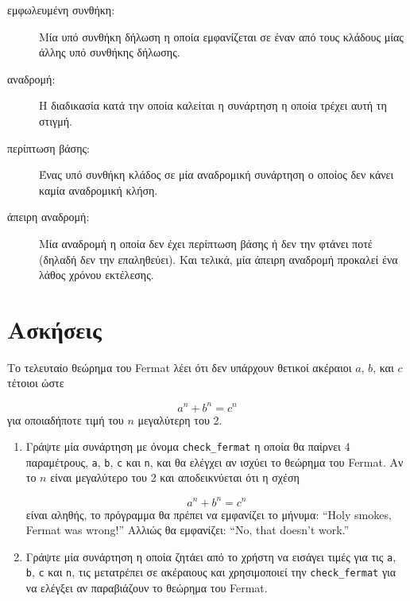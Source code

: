 \documentclass[10pt]{book}
\begin{document}
\begin{description}
\item[εμφωλευμένη συνθήκη:]  Μία υπό συνθήκη δήλωση η οποία εμφανίζεται σε
έναν από τους κλάδους μίας άλλης υπό συνθήκης δήλωσης.

\item[αναδρομή:]  Η διαδικασία κατά την οποία καλείται η συνάρτηση η οποία
τρέχει αυτή τη στιγμή.

\item[περίπτωση βάσης:]  Ένας υπό συνθήκη κλάδος σε μία αναδρομική συνάρτηση
ο οποίος δεν κάνει καμία αναδρομική κλήση.

\item[άπειρη αναδρομή:]  Μία αναδρομή η οποία δεν έχει περίπτωση βάσης ή δεν
την φτάνει ποτέ (δηλαδή δεν την επαληθεύει). Και τελικά, μία άπειρη αναδρομή προκαλεί
ένα λάθος χρόνου εκτέλεσης.

\end{description}

\section{Ασκήσεις}

\begin{exercise}

Το τελευταίο θεώρημα του Fermat λέει ότι δεν υπάρχουν θετικοί ακέραιοι $a$, $b$, και $c$ τέτοιοι ώστε

\[ a^n + b^n = c^n \]
%
για οποιαδήποτε τιμή του $n$ μεγαλύτερη του 2.

\begin{enumerate}

\item Γράψτε μία συνάρτηση με όνομα \verb"check_fermat" η οποία
θα παίρνει 4 παραμέτρους, {\tt a}, {\tt b}, {\tt c} και {\tt n}, 
και θα ελέγχει αν ισχύει το θεώρημα του Fermat. Αν το $n$ είναι μεγαλύτερο
του 2 και αποδεικνύεται ότι η σχέση

\[a^n + b^n = c^n \]
%
είναι αληθής, το πρόγραμμα θα πρέπει να εμφανίζει το μήνυμα:
``Holy smokes, Fermat was wrong!''  Αλλιώς θα εμφανίζει:
``No, that doesn't work.''

\item Γράψτε μία συνάρτηση η οποία ζητάει από το χρήστη να εισάγει τιμές
για τις  {\tt a}, {\tt b}, {\tt c} και {\tt n}, τις μετατρέπει
σε ακέραιους και χρησιμοποιεί την \verb"check_fermat" για να ελέγξει αν
παραβιάζουν το θεώρημα του  Fermat.
\\

\end{enumerate}

\end{exercise}
\end{document}
